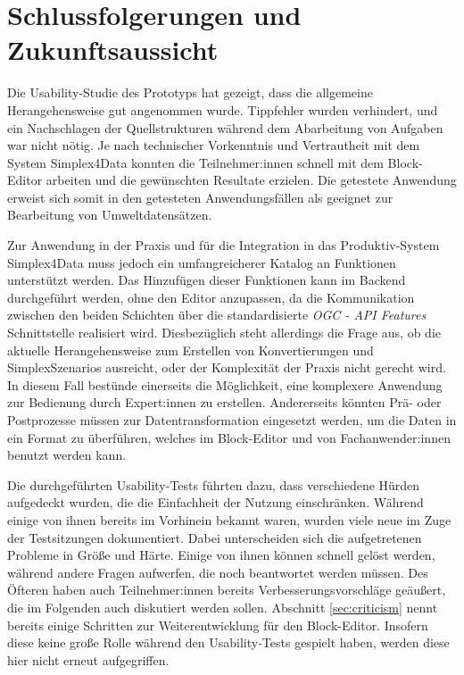 \section{Schlussfolgerungen und Zukunftsaussicht}

Die Usability-Studie des Prototyps hat gezeigt, dass die allgemeine Herangehensweise gut angenommen wurde. Tippfehler wurden verhindert, und ein Nachschlagen der Quellstrukturen während dem Abarbeitung von Aufgaben war nicht nötig. Je nach technischer Vorkenntnis und Vertrautheit mit dem System Simplex4Data konnten die Teilnehmer:innen schnell mit dem Block-Editor arbeiten und die gewünschten Resultate erzielen. Die getestete Anwendung erweist sich somit in den getesteten Anwendungsfällen als geeignet zur Bearbeitung von Umweltdatensätzen.

Zur Anwendung in der Praxis und für die Integration in das Produktiv-System Simplex4Data muss jedoch ein umfangreicherer Katalog an Funktionen unterstützt werden. Das Hinzufügen dieser Funktionen kann im Backend durchgeführt werden, ohne den Editor anzupassen, da die Kommunikation zwischen den beiden Schichten über die standardisierte \textit{OGC - API Features} Schnittstelle realisiert wird. Diesbezüglich steht allerdings die Frage aus, ob die aktuelle Herangehensweise zum Erstellen von Konvertierungen und SimplexSzenarios ausreicht, oder der Komplexität der Praxis nicht gerecht wird. In diesem Fall bestünde einerseits die Möglichkeit, eine komplexere Anwendung zur Bedienung durch Expert:innen zu erstellen. Andererseits könnten Prä- oder Postprozesse müssen zur Datentransformation eingesetzt werden, um die Daten in ein Format zu überführen, welches im Block-Editor und von Fachanwender:innen benutzt werden kann.

Die durchgeführten Usability-Tests führten dazu, dass verschiedene Hürden aufgedeckt wurden, die die Einfachheit der Nutzung einschränken. Während einige von ihnen bereits im Vorhinein bekannt waren, wurden viele neue im Zuge der Testsitzungen dokumentiert. Dabei unterscheiden sich die aufgetretenen Probleme in Größe und Härte. Einige von ihnen können schnell gelöst werden, während andere Fragen aufwerfen, die noch beantwortet werden müssen. Des Öfteren haben auch Teilnehmer:innen bereits Verbesserungsvorschläge geäußert, die im Folgenden auch diskutiert werden sollen. Abschnitt \ref{sec:criticism} nennt bereits einige Schritten zur Weiterentwicklung für den Block-Editor. Insofern diese keine große Rolle während den Usability-Tests gespielt haben, werden diese hier nicht erneut aufgegriffen.

